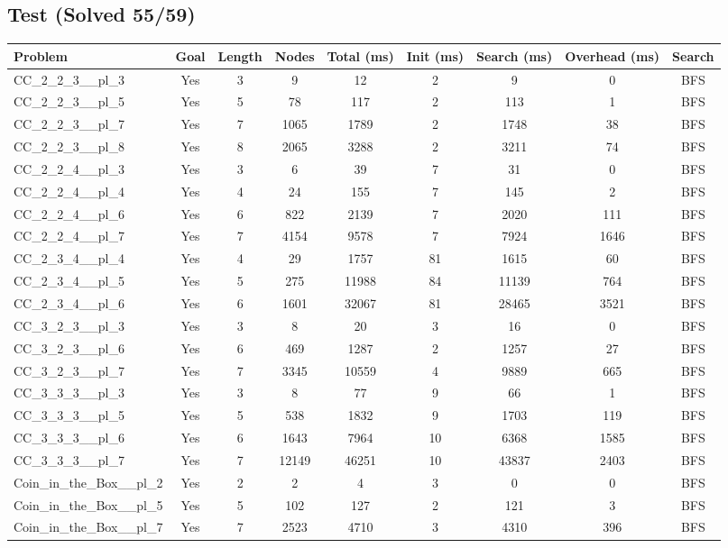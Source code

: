 \documentclass{article}
\begin{document}
\subsection*{Test (Solved 55/59)}
\begin{tabular}{lcccccccc}
\toprule
Problem & Goal & Length & Nodes & Total (ms) & Init (ms) & Search (ms) & Overhead (ms) & Search \\
\midrule
CC\_2\_2\_3\_\_pl\_3 & Yes & 3 & 9 & 12 & 2 & 9 & 0 & BFS \\
CC\_2\_2\_3\_\_pl\_5 & Yes & 5 & 78 & 117 & 2 & 113 & 1 & BFS \\
CC\_2\_2\_3\_\_pl\_7 & Yes & 7 & 1065 & 1789 & 2 & 1748 & 38 & BFS \\
CC\_2\_2\_3\_\_pl\_8 & Yes & 8 & 2065 & 3288 & 2 & 3211 & 74 & BFS \\
CC\_2\_2\_4\_\_pl\_3 & Yes & 3 & 6 & 39 & 7 & 31 & 0 & BFS \\
CC\_2\_2\_4\_\_pl\_4 & Yes & 4 & 24 & 155 & 7 & 145 & 2 & BFS \\
CC\_2\_2\_4\_\_pl\_6 & Yes & 6 & 822 & 2139 & 7 & 2020 & 111 & BFS \\
CC\_2\_2\_4\_\_pl\_7 & Yes & 7 & 4154 & 9578 & 7 & 7924 & 1646 & BFS \\
CC\_2\_3\_4\_\_pl\_4 & Yes & 4 & 29 & 1757 & 81 & 1615 & 60 & BFS \\
CC\_2\_3\_4\_\_pl\_5 & Yes & 5 & 275 & 11988 & 84 & 11139 & 764 & BFS \\
CC\_2\_3\_4\_\_pl\_6 & Yes & 6 & 1601 & 32067 & 81 & 28465 & 3521 & BFS \\
CC\_3\_2\_3\_\_pl\_3 & Yes & 3 & 8 & 20 & 3 & 16 & 0 & BFS \\
CC\_3\_2\_3\_\_pl\_6 & Yes & 6 & 469 & 1287 & 2 & 1257 & 27 & BFS \\
CC\_3\_2\_3\_\_pl\_7 & Yes & 7 & 3345 & 10559 & 4 & 9889 & 665 & BFS \\
CC\_3\_3\_3\_\_pl\_3 & Yes & 3 & 8 & 77 & 9 & 66 & 1 & BFS \\
CC\_3\_3\_3\_\_pl\_5 & Yes & 5 & 538 & 1832 & 9 & 1703 & 119 & BFS \\
CC\_3\_3\_3\_\_pl\_6 & Yes & 6 & 1643 & 7964 & 10 & 6368 & 1585 & BFS \\
CC\_3\_3\_3\_\_pl\_7 & Yes & 7 & 12149 & 46251 & 10 & 43837 & 2403 & BFS \\
Coin\_in\_the\_Box\_\_pl\_2 & Yes & 2 & 2 & 4 & 3 & 0 & 0 & BFS \\
Coin\_in\_the\_Box\_\_pl\_5 & Yes & 5 & 102 & 127 & 2 & 121 & 3 & BFS \\
Coin\_in\_the\_Box\_\_pl\_7 & Yes & 7 & 2523 & 4710 & 3 & 4310 & 396 & BFS \\

\end{tabular}
\end{document}
